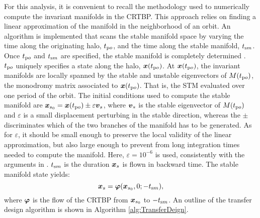 For this analysis, it is convenient to recall the methodology used to numerically compute the invariant manifolds in the CRTBP. This approach relies on finding a linear approximation of the manifold in the neighborhood of an orbit. An algorithm is implemented that scans the stable manifold space by varying the time along the originating halo, $t_{\textrm po}$, and the time along the stable manifold, $t_{\textrm sm}$. Once $t_{\textrm po}$ and $t_{\textrm sm}$ are specified, the stable manifold is completely determined \cite{topputo2016fastmanifolds}. $t_{\textrm po}$ uniquely specifies a state along the halo, $\boldsymbol{x}(t_{\textrm po})$. At $\boldsymbol{x}(t_{\textrm po})$, the invariant manifolds are locally spanned by the stable and unstable eigenvectors of $M(t_{\textrm po})$, the monodromy matrix associated to $\boldsymbol{x}(t_{\textrm po})$. That is, the STM evaluated over one period of the orbit. The initial conditions used to compute the stable manifold are $\boldsymbol{x}_{s_0} = \boldsymbol{x}(t_{\textrm po})\pm\varepsilon \boldsymbol{v}_s$, where $\boldsymbol{v}_s$ is the stable eigenvector of $M(t_{\textrm po})$ and $\varepsilon$ is a small displacement perturbing in the stable direction, whereas the $\pm$ discriminates which of the two branches of the manifold has to be generated. As for $\varepsilon$, it should be small enough to preserve the local validity of the linear approximation, but also large enough to prevent from long integration times needed to compute the manifold. Here, $\varepsilon=10^{-6}$ is used, consistently with the arguments in \textcite{gomez1993study}. $t_{\textrm sm}$ is the duration $\boldsymbol{x}_s$ is flown in backward time. The stable manifold state yields:
%
\begin{equation}
\label{eq:stablemanifoldstate}
\boldsymbol{x}_s = \boldsymbol{\varphi}(\boldsymbol{x}_{s_0},0;-t_{\textrm sm}),
\end{equation}
%
where $\boldsymbol{\varphi}$ is the flow of the CRTBP from $\boldsymbol{x}_{s_0}$ to $-t_{\textrm sm}$. An outline of the transfer design algorithm is shown in Algorithm \ref{alg:TransferDeign}.
%
